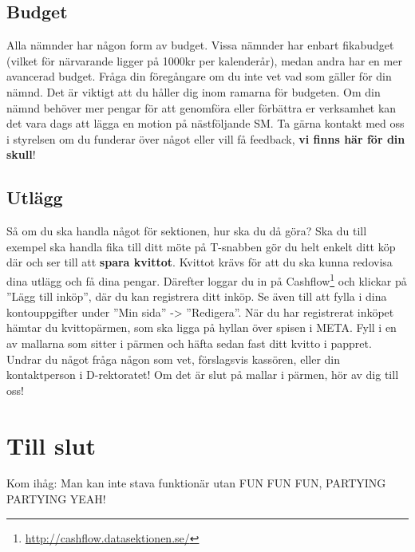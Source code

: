 \documentclass[a4paper,11pt]{article}
\begin{document}
\subsection{Budget}
Alla nämnder har någon form av budget. Vissa nämnder har enbart fikabudget (vilket för närvarande ligger på 1000kr per kalenderår), medan andra har en mer avancerad budget. Fråga din föregångare om du inte vet vad som gäller för din nämnd. Det är viktigt att du håller dig inom ramarna för budgeten. Om din nämnd behöver mer pengar för att genomföra eller förbättra er verksamhet kan det vara dags att lägga en motion på nästföljande SM. Ta gärna kontakt med oss i styrelsen om du funderar över något eller vill få feedback,\textbf{ vi finns här för din skull}!

\subsection{Utlägg}
Så om du ska handla något för sektionen, hur ska du då göra? Ska du till exempel ska handla fika till ditt möte på T-snabben gör du helt enkelt ditt köp där och ser till att \textbf{spara kvittot}. Kvittot krävs för att du ska kunna redovisa dina utlägg och få dina pengar. Därefter loggar du in på Cashflow\footnote{\url{http://cashflow.datasektionen.se/}} och klickar på ''Lägg till inköp'', där du kan registrera ditt inköp. Se även till att fylla i dina kontouppgifter under ''Min sida'' -> ''Redigera''. När du har registrerat inköpet hämtar du kvittopärmen, som ska ligga på hyllan över spisen i META. Fyll i en av mallarna som sitter i pärmen och häfta sedan fast ditt kvitto i pappret. Undrar du något fråga någon som vet, förslagsvis kassören, eller din kontaktperson i D-rektoratet! Om det är slut på mallar i pärmen, hör av dig till oss!

\section{Till slut}
Kom ihåg: Man kan inte stava funktionär utan FUN FUN FUN, PARTYING PARTYING YEAH!
\end{document}
